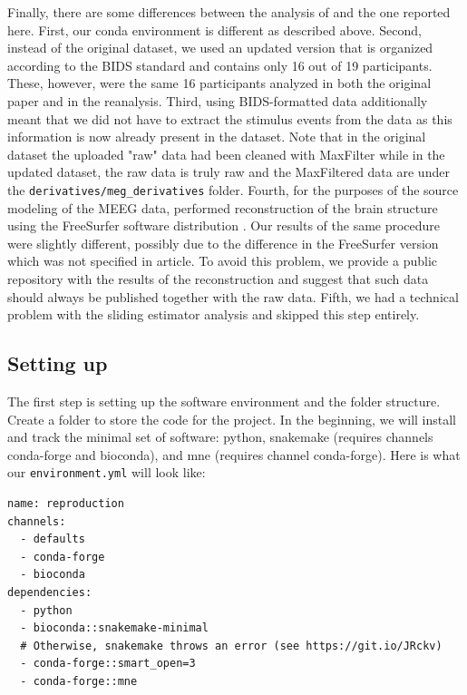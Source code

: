 \documentclass[a4paper,man,floatsintext,natbib]{apa6}
\begin{document}
Finally, there are some differences between the analysis of \cite{jasReproducibleMEGEEG2018a} and the one reported here. First, our conda environment is different as described above. Second, instead of the original \cite{wakemanMultisubjectMultimodalHuman2015} dataset, we used an updated version that is organized according to the BIDS standard \citep{gorgolewskiBrainImagingData2016} and contains only 16 out of 19 participants. These, however, were the same 16 participants analyzed in both the original paper and in the \cite{jasReproducibleMEGEEG2018a} reanalysis. Third, using BIDS-formatted data additionally meant that we did not have to extract the stimulus events from the data as this information is now already present in the dataset. Note that in the original dataset the uploaded "raw" data had been cleaned with MaxFilter \citep{tauluPresentationElectromagneticMultichannel2005} while in the updated dataset, the raw data is truly raw and the MaxFiltered data are under the \verb|derivatives/meg_derivatives| folder. Fourth, for the purposes of the source modeling of the MEEG data, \cite{jasReproducibleMEGEEG2018a} performed reconstruction of the brain structure using the FreeSurfer software distribution \citep{fischlFreeSurfer2012}. Our results of the same procedure were slightly different, possibly due to the difference in the FreeSurfer version which was not specified in \cite{jasReproducibleMEGEEG2018a} article. To avoid this problem, we provide a public repository with the results of the reconstruction and suggest that such data should always be published together with the raw data. Fifth, we had a technical problem with the sliding estimator analysis and skipped this step entirely.

\subsection{Setting up}
The first step is setting up the software environment and the folder structure. Create a folder to store the code for the project. In the beginning, we will install and track the minimal set of software: python, snakemake (requires channels conda-forge and bioconda), and mne (requires channel conda-forge). Here is what our \verb|environment.yml| will look like:

\begin{verbatim}
name: reproduction
channels:
  - defaults
  - conda-forge
  - bioconda
dependencies:
  - python
  - bioconda::snakemake-minimal
  # Otherwise, snakemake throws an error (see https://git.io/JRckv)
  - conda-forge::smart_open=3
  - conda-forge::mne
\end{verbatim}
\end{document}
